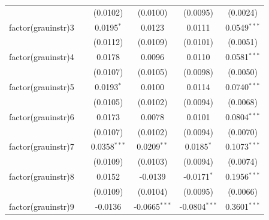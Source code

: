 \begin{tabular}{lccccc}
                            &                       & (0.0102)                & (0.0100)                & (0.0095)                & (0.0024)\\   
   factor(grauinstr)3       &                       & 0.0195$^{*}$            & 0.0123                  & 0.0111                  & 0.0549$^{***}$\\   
                            &                       & (0.0112)                & (0.0109)                & (0.0101)                & (0.0051)\\   
   factor(grauinstr)4       &                       & 0.0178                  & 0.0096                  & 0.0110                  & 0.0581$^{***}$\\   
                            &                       & (0.0107)                & (0.0105)                & (0.0098)                & (0.0050)\\   
   factor(grauinstr)5       &                       & 0.0193$^{*}$            & 0.0100                  & 0.0114                  & 0.0740$^{***}$\\   
                            &                       & (0.0105)                & (0.0102)                & (0.0094)                & (0.0068)\\   
   factor(grauinstr)6       &                       & 0.0173                  & 0.0078                  & 0.0101                  & 0.0804$^{***}$\\   
                            &                       & (0.0107)                & (0.0102)                & (0.0094)                & (0.0070)\\   
   factor(grauinstr)7       &                       & 0.0358$^{***}$          & 0.0209$^{**}$           & 0.0185$^{*}$            & 0.1073$^{***}$\\   
                            &                       & (0.0109)                & (0.0103)                & (0.0094)                & (0.0074)\\   
   factor(grauinstr)8       &                       & 0.0152                  & -0.0139                 & -0.0171$^{*}$           & 0.1956$^{***}$\\   
                            &                       & (0.0109)                & (0.0104)                & (0.0095)                & (0.0066)\\   
   factor(grauinstr)9       &                       & -0.0136                 & -0.0665$^{***}$         & -0.0804$^{***}$         & 0.3601$^{***}$\\   

\end{tabular}
